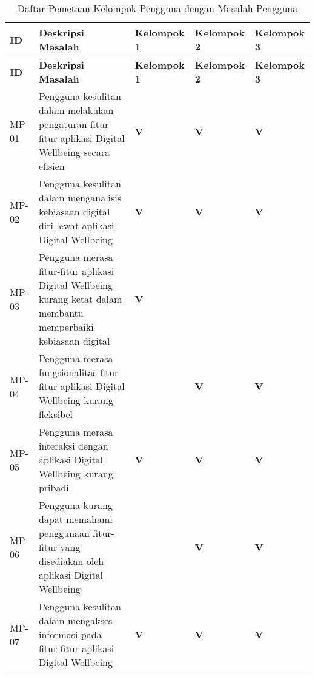 \RaggedLeft
\begin{footnotesize}
\begin{longtable}[c]{|>{\ccnormspacing}m{}|>{\ccnormspacing}m{}|>{\ccnormspacingcenter}m{}|>{\ccnormspacingcenter}m{}|>{\ccnormspacingcenter}m{}|}
  \caption{Daftar Pemetaan Kelompok Pengguna dengan Masalah Pengguna}
  \label{tab:pemetaan_masalah} \\
  \hline \rowcolor[HTML]{A3E5F5}
  \centering\textbf{ID} & \centering\textbf{Deskripsi Masalah} & \textbf{Kelompok 1} & \textbf{Kelompok 2} & \textbf{Kelompok 3} \\ \hline \endfirsthead
  \hline \rowcolor[HTML]{A3E5F5}
  \centering\textbf{ID} & \centering\textbf{Deskripsi Masalah} & \textbf{Kelompok 1} & \textbf{Kelompok 2} & \textbf{Kelompok 3} \\ \hline \endhead

  \hline \endfoot

  \centering MP-01 & Pengguna kesulitan dalam melakukan pengaturan fitur-fitur aplikasi Digital Wellbeing secara efisien & \textbf{V} & \textbf{V} & \textbf{V} \\ \hline
  \centering MP-02 & Pengguna kesulitan dalam menganalisis kebiasaan digital diri lewat aplikasi Digital Wellbeing & \textbf{V} & \textbf{V} & \textbf{V} \\ \hline
  \centering MP-03 & Pengguna merasa fitur-fitur aplikasi Digital Wellbeing kurang ketat dalam membantu memperbaiki kebiasaan digital & \textbf{V} &  &  \\ \hline
  \centering MP-04 & Pengguna merasa fungsionalitas fitur-fitur aplikasi Digital Wellbeing kurang fleksibel &  & \textbf{V} & \textbf{V} \\ \hline
  \centering MP-05 & Pengguna merasa interaksi dengan aplikasi Digital Wellbeing kurang pribadi & \textbf{V} & \textbf{V} & \textbf{V} \\ \hline
  \centering MP-06 & Pengguna kurang dapat memahami penggunaan fitur-fitur yang disediakan oleh aplikasi Digital Wellbeing &  & \textbf{V} & \textbf{V} \\ \hline
  \centering MP-07 & Pengguna kesulitan dalam mengakses informasi pada fitur-fitur aplikasi Digital Wellbeing & \textbf{V} & \textbf{V} & \textbf{V} \\ \hline

\end{longtable}
\end{footnotesize}
\justifying
\FloatBarrier

